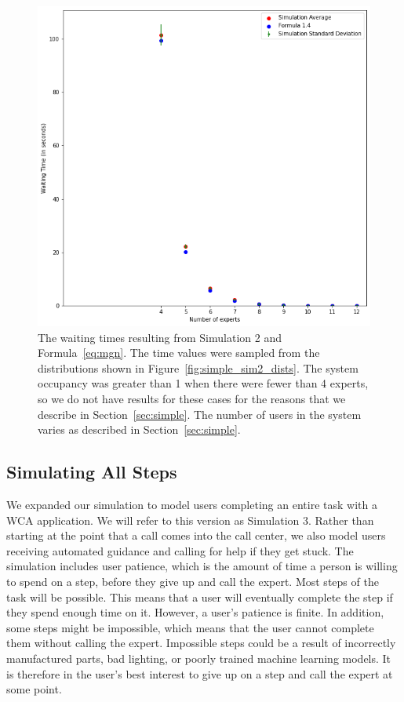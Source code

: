 \begin{figure}[H]
  \includegraphics[width=\textwidth]{figures/montecarlo/independent_calls_lognorm.png}
  \caption{
    The waiting times resulting from Simulation 2 and Formula~\ref{eq:mgn}.
    The time values were sampled from the distributions shown in
    Figure~\ref{fig:simple_sim2_dists}.
    The system occupancy was greater than 1 when there were fewer than 4
    experts, so we do not have results for these cases for the reasons that we
    describe in Section~\ref{sec:simple}.
    The number of users in the system varies as described in
    Section~\ref{sec:simple}.
  }\label{fig:simple_sim2_results}
\end{figure}

\subsection{Simulating All Steps}

We expanded our simulation to model users completing an entire task with a WCA
application.
We will refer to this version as Simulation 3.
Rather than starting at the point that a call comes into the call center, we
also model users receiving automated guidance and calling for help if they get
stuck.
The simulation includes user patience, which is the amount of time a person is
willing to spend on a step, before they give up and call the expert.
Most steps of the task will be possible.
This means that a user will eventually complete the step if they spend enough
time on it.
However, a user's patience is finite.
In addition, some steps might be impossible, which means that the user cannot
complete them without calling the expert.
Impossible steps could be a result of incorrectly manufactured parts, bad
lighting, or poorly trained machine learning models.
It is therefore in the user's best interest to give up on a step and call the
expert at some point.

